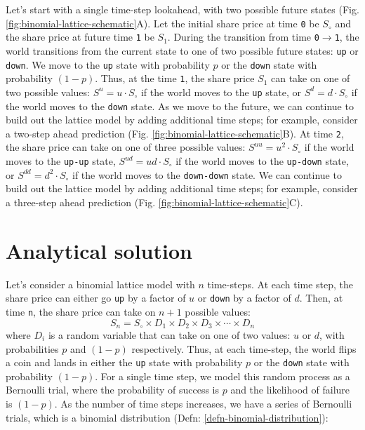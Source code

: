 \documentclass[11pt]{article}
\theoremstyle{definition}
\begin{document}
Let's start with a single time-step lookahead, with two possible future states (Fig. \ref{fig:binomial-lattice-schematic}A).
Let the initial share price at time \texttt{0} be $S_{\circ}$ and the share price at future time \texttt{1} be $S_{1}$.
During the transition from time \texttt{0}$\rightarrow$\texttt{1}, the world transitions from the current state to one of two possible future states: \texttt{up} or \texttt{down}.
We move to the \texttt{up} state with probability $p$ or the \texttt{down} state with probability $(1-p)$.
Thus, at the time \texttt{1}, the share price $S_{1}$ can take on one of two possible values: $S^{u} = u\cdot{S_{\circ}}$ if the world moves 
to the \texttt{up} state, or $S^{d} = d\cdot{S_{\circ}}$ if the world moves to the \texttt{down} state. 
As we move to the future, we can continue to build out the lattice model by adding additional time steps; for example, consider a two-step ahead prediction (Fig. \ref{fig:binomial-lattice-schematic}B). 
At time \texttt{2}, the share price can take on one of three possible values: $S^{uu} = u^{2}\cdot{S_{\circ}}$ if the world moves
to the \texttt{up-up} state, $S^{ud} = ud\cdot{S_{\circ}}$ if the world moves to the \texttt{up-down} state, or $S^{dd} = d^{2}\cdot{S_{\circ}}$ if the world moves to the \texttt{down-down} state.
We can continue to build out the lattice model by adding additional time steps; for example, consider a three-step ahead prediction (Fig. \ref{fig:binomial-lattice-schematic}C).

\section*{Analytical solution}
Let's consider a binomial lattice model with $n$ time-steps. At each time step, the share price can either go \texttt{up} by a factor of $u$ or \texttt{down} by a factor of $d$.
Then, at time \texttt{n}, the share price can take on $n+1$ possible values: 
\begin{equation}
	S_{n} = S_{\circ}\times{D_{1}}\times{D_{2}}\times{D_{3}}\times\cdots\times{D_{n}}
\end{equation}
where $D_{i}$ is a random variable that can take on one of two values: $u$ or $d$, 
with probabilities $p$ and $(1-p)$ respectively. 
Thus, at each time-step, the world flips a coin and lands in either the \texttt{up} state with probability $p$ or the \texttt{down} state with probability $(1-p)$.
For a single time step, we model this random process as a Bernoulli trial, where the probability of success is $p$ and the likelihood of failure is $(1-p)$.
As the number of time steps increases, we have a series of Bernoulli trials, which is a binomial distribution (Defn: \ref{defn-binomial-distribution}):
\end{document}
